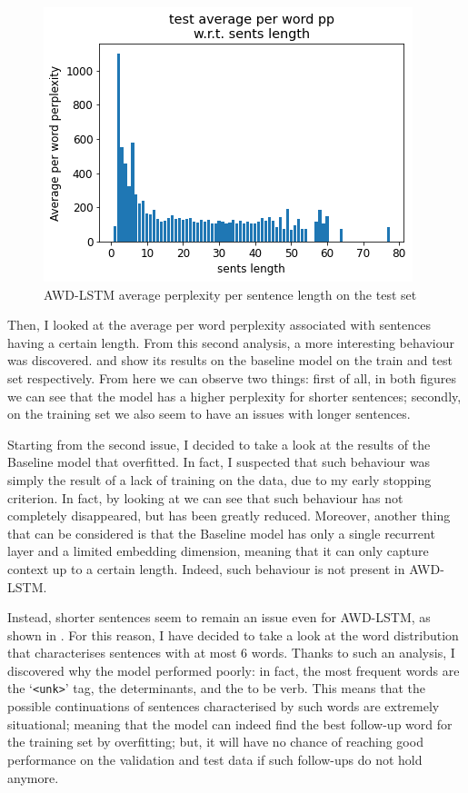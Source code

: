 \begin{figure}[!t]
    \centering
    \includegraphics[scale=0.40]{assets/awdlstm_test_pp_per_length.png}
    \vspace{-1.0em}
    \caption{AWD-LSTM average perplexity per sentence length on the test set}
    \vspace{-1.0em}
    \label{fig:awdlstm-test-pp}
\end{figure}

Then, I looked at the average per word perplexity associated with sentences having a certain length. From this second analysis, a more interesting behaviour was discovered.  and  show its results on the baseline model on the train and test set respectively. From here we can observe two things: first of all, in both figures we can see that the model has a higher perplexity for shorter sentences; secondly, on the training set we also seem to have an issues with longer sentences.

Starting from the second issue, I decided to take a look at the results of the Baseline model that overfitted. In fact, I suspected that such behaviour was simply the result of a lack of training on the data, due to my early stopping criterion. In fact, by looking at  we can see that such behaviour has not completely disappeared, but has been greatly reduced. Moreover, another thing that can be considered is that the Baseline model has only a single recurrent layer and a limited embedding dimension, meaning that it can only capture context up to a certain length. Indeed, such behaviour is not present in AWD-LSTM.

Instead, shorter sentences seem to remain an issue even for AWD-LSTM, as shown in . For this reason, I have decided to take a look at the word distribution that characterises sentences with at most 6 words. Thanks to such an analysis, I discovered why the model performed poorly: in fact, the most frequent words are the `\texttt{<unk>}' tag, the determinants, and the to be verb. This means that the possible continuations of sentences characterised by such words are extremely situational; meaning that the model can indeed find the best follow-up word for the training set by overfitting; but, it will have no chance of reaching good performance on the validation and test data if such follow-ups do not hold anymore.